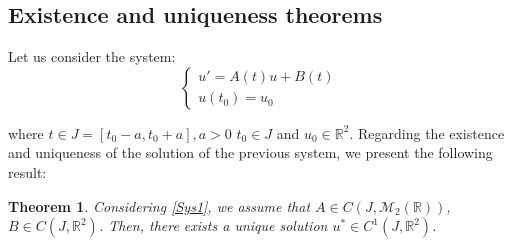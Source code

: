 \documentclass[a4paper,11pt]{report}
\newtheorem{theorem}{Theorem}[subsection]
\newcommand{\R}{\mathbb{R}}
\begin{document}
\subsection{Existence and uniqueness theorems}

Let us consider the system:
\begin{equation}
 \begin{cases}
  u'=A(t)u+B(t)\\
u(t_{0})=u_{0}
 \end{cases}\label{Sys1}\tag{Sys1}
\end{equation}

where $t\in J=[t_{0}-a,t_{0}+a], a>0$ $t_{0}\in J$ and $u_{0}\in\R^{2}$. \newline
Regarding the existence and uniqueness of the solution of the previous system, we present the following result:
\begin{theorem}
 Considering \eqref{Sys1}, we assume that $A\in C(J,\mathcal{M}_{2}(\R))$, $B\in C(J,\R^{2})$. Then, there exists a unique 
 solution $u^{*}\in C^{1}(J,\R^{2})$.
\end{theorem}
\end{document}
